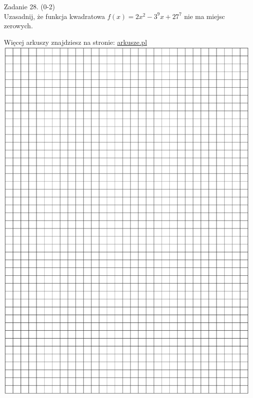 \documentclass[10pt]{article}
\begin{document}
Zadanie 28. (0-2)\\
Uzasadnij, że funkcja kwadratowa \(f(x)=2 x^{2}-3^{9} x+27^{7}\) nie ma miejsc zerowych.

Więcej arkuszy znajdziesz na stronie: \href{http://arkusze.pl}{arkusze.pl}\\
\includegraphics[max width=\textwidth, center]{2024_11_21_4a1915d79134dda0750eg-14}
\end{document}
